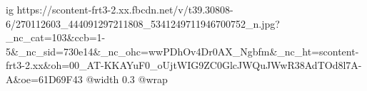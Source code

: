  
 
 
 
 

\ifcmt
  ig https://scontent-frt3-2.xx.fbcdn.net/v/t39.30808-6/270112603_444091297211808_5341249711946700752_n.jpg?_nc_cat=103&ccb=1-5&_nc_sid=730e14&_nc_ohc=wwPDhOv4Dr0AX_Ngbfm&_nc_ht=scontent-frt3-2.xx&oh=00_AT-KKAYuF0_oUjtWIG9ZC0GlcJWQuJWwR38AdTOd8l7A-A&oe=61D69F43
  @width 0.3
  @wrap \parpic[r]
\fi
